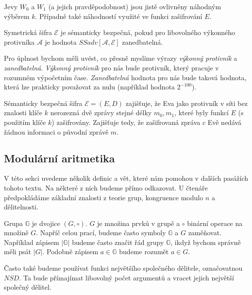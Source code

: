 \documentclass[
  program=infoi,
  biblatex=false,
  figures=true,
  glossaries,
  tables=false,
  sourcecodes=true,
  index
]{kidiplom}
\begin{document}
        \begin{remark}
            Jevy $W_0$ a $W_1$ (a jejich pravděpodobnost) jsou jistě ovlivněny náhodným výběrem $k$.
            Případně také náhodností využité ve funkci zašifrování $E$.
        \end{remark}

        \begin{definition}\label{def:ss-private}
            Symetrická šifra $\mathcal{E}$ je sémanticky bezpečná, pokud pro libovolného výkonného protivníka $\mathcal{A}$
            je hodnota $SSadv[\mathcal{A}, \mathcal{E}]$ zanedbatelná.
        \end{definition}


        Pro úplnost bychom měli uvést, co přesně myslíme výrazy \emph{výkonný protivník} a \emph{zanedbatelná}.
        \emph{Výkonný protivník} pro nás bude protivník, který pracuje v rozumném výpočetním čase.
        \emph{Zanedbatelná} hodnota pro nás bude taková hodnota, která lze prakticky považovat za nulu (například hodnota $2^{-100}$).

        Sémanticky bezpečná šifra $\mathcal{E}  = (E, D)$ zajišťuje, že Eva jako protivník v síti bez znalosti klíče $k$
        nerozezná dvě zprávy stejné délky $m_0, m_1$, které byly funkcí $E$ (s použitím klíče $k$) zašifrovány.
        Zajišťuje tedy, že zašifrovaná zpráva $c$ Evě nedává žádnou informaci o původní zprávě $m$.


\subsection{Modulární aritmetika}\label{sub:modular-arithmetic}

    V této sekci uvedeme několik definic a vět, které nám pomohou v dalších pasážích tohoto textu.
    Na některé z nich budeme přímo odkazovat.
    U čtenáře předpokládáme základní znalosti z teorie grup, kongruence modulo $n$ a dělitelnosti.

    Grupa $\mathbb{G}$ je dvojice $(G, \circ)$. $G$ je množina prvků v grupě a $\circ$ binární operace na množině $G$.
    Napříč celou prací, budeme často symboly $\mathbb{G}$ a $G$ zaměňovat.
    Například zápisem $|\mathbb{G}|$ budeme často značit řád grupy $\mathbb{G}$, ikdyž bychom správně měli psát $|G|$.
    Podobně zápisem $a \in \mathbb{G}$ budeme rozumět $a \in G$.

    Často také budeme používat funkci největšího společného dělitele, označovatnou $NSD$.
    Ta bude přímajímat libovolný počet argumentů a vracet jejich největší společný dělitel.
\end{document}
